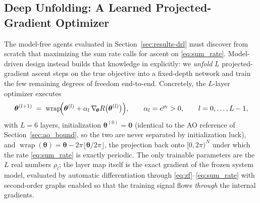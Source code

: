 
\subsection{Deep Unfolding: A Learned Projected-Gradient Optimizer}

The model-free agents evaluated in Section~\ref{sec:results-drl} must discover from
scratch that maximizing the sum rate calls for ascent on
\eqref{eq:sum_rate}. Model-driven design instead builds that knowledge in
explicitly: we \emph{unfold} $L$ projected-gradient ascent steps on the true
objective into a fixed-depth network and train the few remaining degrees of
freedom end-to-end. Concretely, the $L$-layer optimizer executes
\begin{equation}
\boldsymbol{\theta}^{(l+1)}
\;=\; \operatorname{wrap}\!\Bigl(\boldsymbol{\theta}^{(l)}
+ \alpha_l \, \nabla_{\!\boldsymbol{\theta}}
R\bigl(\boldsymbol{\theta}^{(l)}\bigr)\Bigr),
\qquad
\alpha_l = e^{\rho_l} > 0,
\qquad l = 0, \dots, L-1,
\label{eq:unrolled_pg}
\end{equation}
with $L = 6$ layers, initialization
$\boldsymbol{\theta}^{(0)} = \boldsymbol{0}$ (identical to the AO reference of
Section~\ref{sec:ao_bound}, so the two are never separated by initialization
luck), and $\operatorname{wrap}(\boldsymbol{\theta}) =
\boldsymbol{\theta} - 2\pi\lfloor \boldsymbol{\theta}/2\pi \rfloor$, the
projection back onto $[0,2\pi)^N$ under which the rate
\eqref{eq:sum_rate} is exactly periodic. The only trainable parameters are the
$L$ real numbers $\rho_l$; the layer map itself is the exact gradient of the
frozen system model, evaluated by automatic differentiation through
\eqref{eq:zf}--\eqref{eq:sum_rate} with second-order graphs enabled so that the
training signal flows \emph{through} the internal gradients.

